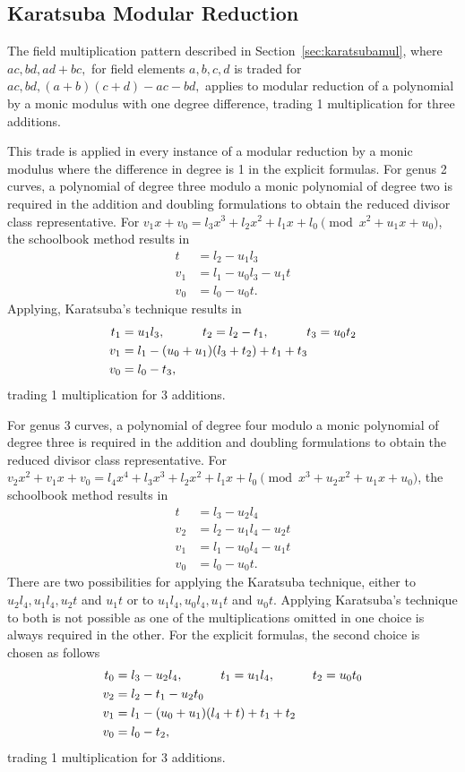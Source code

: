 \subsection{Karatsuba Modular Reduction} 
\label{sec:karatsubared}
The field multiplication pattern described in Section~\ref{sec:karatsubamul},
where $ac, bd, ad + bc,$ for field elements $a,b,c,d$  is traded for $ ac, bd,
(a + b)(c + d) - ac - bd,$ applies to modular reduction of a polynomial by a
monic modulus with one degree difference, trading 1 multiplication for three
additions.

This trade is applied in every instance of a modular reduction by a monic
modulus where the difference in degree is 1 in the explicit formulas. For genus
2 curves, a polynomial of degree three modulo a monic polynomial of degree two
is required in the addition and doubling formulations to obtain the reduced
divisor class representative. For $v_1x + v_0 = l_3x^3 + l_2x^2 + l_1x + l_0
\pmod{x^2 + u_1x + u_0}$, the schoolbook method results in 
\begin{align*}
t &= l_2 - u_1l_3\\
v_1 &= l_1 - u_0l_3 - u_1t\\
v_0 &= l_0 - u_0t.
\end{align*}
Applying, Karatsuba's technique results in
\begin{align*}
t_1 &= u_1l_3, \quad\quad\quad t_2 = l_2 - t_1, \quad\quad\quad t_3 = u_0t_2\\
v_1 &= l_1 - (u_0 + u_1)(l_3 + t_2) + t_1 + t_3\\
v_0 &= l_0 - t_3,
\end{align*}
trading 1 multiplication for 3 additions.


For genus 3 curves, a polynomial of degree four modulo a monic polynomial of
degree three is required in the addition and doubling formulations to obtain the
reduced divisor class representative. For $v_2x^2 + v_1x + v_0 = l_4x^4 + l_3x^3
+ l_2x^2 + l_1x + l_0 \pmod{x^3 + u_2x^2 + u_1x + u_0}$, the schoolbook method results in 
\begin{align*}
t &= l_3 - u_2l_4\\
v_2 &= l_2 - u_1l_4 - u_2t\\
v_1 &= l_1 - u_0l_4 - u_1t\\
v_0 &= l_0 - u_0t.
\end{align*}
There are two possibilities for applying the Karatsuba technique, either to
$u_2l_4, u_1l_4, u_2t$ and $u_1t$ or to $u_1l_4, u_0l_4, u_1t$ and $u_0t$.
Applying Karatsuba's technique to both is not possible as one of the
multiplications omitted in one choice is always required in the other. For the
explicit formulas, the second choice is chosen as follows
\begin{align*}
t_0 &= l_3 - u_2l_4, \quad\quad\quad t_1 = u_1l_4, \quad\quad\quad t_2 = u_0t_0\\
v_2 &= l_2 - t_1 - u_2t_0\\
v_1 &= l_1 - (u_0 + u_1)(l_4 + t) + t_1 + t_2\\
v_0 &= l_0 - t_2,
\end{align*}
trading 1 multiplication for 3 additions.


